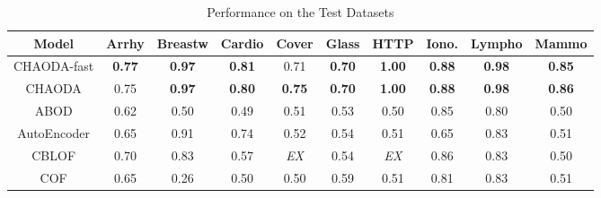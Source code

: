 
\begin{table*}[!t]
\renewcommand{\arraystretch}{1.2}
\caption{Performance on the Test Datasets}
\label{table:results:test-performance}
\vskip 0.15in
\begin{center}
\begin{small}
\begin{tabular}{|c|c|c|c|c|c|c|c|c|c|}
\hline
\textbf{Model} & \textbf{Arrhy} & \textbf{Breastw} & \textbf{Cardio} & \textbf{Cover} & \textbf{Glass} & \textbf{HTTP} & \textbf{Iono.} & \textbf{Lympho} & \textbf{Mammo} \\
\hline
        CHAODA-fast &       \textbf{0.77} &    \textbf{0.97} &   \textbf{0.81} &           0.71 &  \textbf{0.70} & \textbf{1.00} &                \textbf{0.88} &   \textbf{0.98} &  \textbf{0.85} \\
\hline
        CHAODA &       0.75 &    \textbf{0.97} &   \textbf{0.80} &  \textbf{0.75} &  \textbf{0.70} & \textbf{1.00} &                \textbf{0.88} &   \textbf{0.98} &  \textbf{0.86} \\
\hline
                ABOD &                0.62 &             0.50 &            0.49 &           0.51 &           0.53 &          0.50 &                0.85 &            0.80 &           0.50 \\
\hline
        AutoEncoder &                0.65 &             0.91 &            0.74 &           0.52 &           0.54 &          0.51 &                0.65 &            0.83 &           0.51 \\
\hline
                CBLOF &                0.70 &             0.83 &            0.57 &    \textit{EX} &           0.54 &   \textit{EX} &                0.86 &            0.83 &           0.50 \\
\hline
                COF &                0.65 &             0.26 &            0.50 &           0.50 &           0.59 &          0.51 &                0.81 &            0.83 &           0.51 \\

\end{tabular}
\end{small}
\end{center}
\end{table*}
